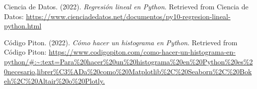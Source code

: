 \documentclass{wsdcr}
\begin{document}
\begin{thebibliography}{9}
    Ciencia de Datos. (2022).
    \textit{Regresión lineal en Python}.
    Retrieved from Ciencia de Datos: \url{https://www.cienciadedatos.net/documentos/py10-regresion-lineal-python.html}

    Código Piton. (2022).
    \textit{Cómo hacer un histograma en Python}.
    Retrieved from Código Piton: \url{https://www.codigopiton.com/como-hacer-un-histograma-en-python/#:~:text=Para%20hacer%20un%20histograma%20en%20Python%20es%20necesario,librer%C3%ADa%20como%20Matplotlib%2C%20Seaborn%2C%20Bokeh%2C%20Altair%20o%20Plotly.}

\end{thebibliography}







\end{document}
